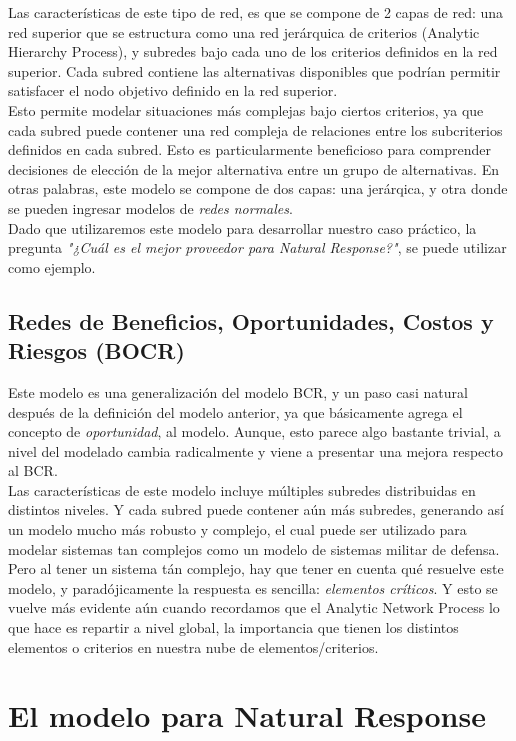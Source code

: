 \documentclass[12pt,twocolumn]{article}
\begin{document}
Las características de este tipo de red, es que se compone de 2 capas de red: una red superior que se estructura como una red jerárquica de criterios (Analytic Hierarchy Process), y subredes bajo cada uno de los criterios definidos en la red superior. Cada subred contiene las alternativas disponibles que podrían permitir satisfacer el nodo objetivo definido en la red superior.\\
\indent Esto permite modelar situaciones más complejas bajo ciertos criterios, ya que cada subred puede contener una red compleja de relaciones entre los subcriterios definidos en cada subred. Esto es particularmente beneficioso para comprender decisiones de elección de la mejor alternativa entre un grupo de alternativas. En otras palabras, este modelo se compone de dos capas: una jerárqica, y otra donde se pueden ingresar modelos de \textit{redes normales}.\\
Dado que utilizaremos este modelo para desarrollar nuestro caso práctico, la pregunta \textit{"¿Cuál es el mejor proveedor para Natural Response?"}, se puede utilizar como ejemplo.
\subsection{Redes de  Beneficios, Oportunidades, Costos y Riesgos (BOCR)}
Este modelo es una generalización del modelo BCR, y un paso casi natural después de la definición del modelo anterior, ya que básicamente agrega el concepto de \textit{oportunidad}, al modelo. Aunque, esto parece algo bastante trivial, a nivel del modelado cambia radicalmente y viene a presentar una mejora respecto al BCR.\\

Las características de este modelo incluye múltiples subredes distribuidas en distintos niveles. Y cada subred puede contener aún más subredes, generando así un modelo mucho más robusto y complejo, el cual puede ser utilizado para modelar sistemas tan complejos como un modelo de sistemas militar de defensa.\\
\indent Pero al tener un sistema tán complejo, hay que tener en cuenta qué resuelve este modelo, y paradójicamente la respuesta es sencilla: \textit{elementos críticos}. Y esto se vuelve más evidente aún cuando recordamos que el Analytic Network Process lo que hace es repartir a nivel global, la importancia que tienen los distintos elementos o criterios en nuestra nube de elementos/criterios.

\newpage
\section{El modelo para Natural Response}
\end{document}

